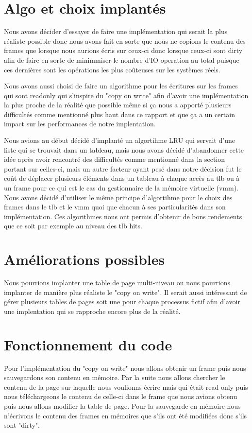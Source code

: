 \documentclass{article}
\begin{document}
\section{Algo et choix implantés}
Nous avons décider d'essayer de faire une implémentation qui serait la plus réaliste possible donc nous avons fait en sorte que nous ne copions le contenu des frames que lorsque nous aurions écris sur ceux-ci donc lorsque ceux-ci sont dirty afin de faire en sorte de minimmiser le nombre d'IO operation au total puisque ces dernières sont les opérations les plus coûteuses sur les systèmes réels. 
\par
Nous avons aussi choisi de faire un algorithme pour les écritures sur les frames qui sont readonly qui s'inspire du "copy on write" afin d'avoir une implémentation la plus proche de la réalité que possible même si ça nous a apporté plusieurs difficultés comme mentionné  plus haut dans ce rapport et que ça a un certain impact sur les performances de notre implentation.
\par 
Nous avions au début décidé d'implanté un algortihme LRU qui servait d'une liste qui se trouvait dans un tableau, mais nous avons décidé d'abandonner cette idée après avoir rencontré des difficultés comme mentionné dans la section portant sur celles-ci, mais un autre facteur ayant pesé dans notre décision fut le coût de déplacer plusieurs éléments dans un tableau à chaque accès au tlb ou à un frame pour ce qui est le cas du gestionnaire de la mémoire virtuelle (vmm). Nous avons décidé d'utiliser le même principe d'algortihme pour le choix des frames dans le tlb et le vmm quoi que chacun à ses particularités dans son  implémentation.  Ces algorithmes nous ont permis d'obtenir de bons rendements que ce soit par exemple au niveau des tlb hits.
\section{Améliorations possibles}
Nous pourrions implanter une table de page multi-niveau ou nous pourrions implanter de manière plus réaliste le "copy on write". Il serait aussi intéressant de gérer plusieurs tables de pages soit une pour chaque processus fictif afin d'avoir une implentation qui se rapproche encore plus de la réalité.

\section{Fonctionnement du code}

Pour l'implémentation du "copy on write" nous allons obtenir un frame puis nous sauvegardons son contenu en mémoire. Par la suite nous allons chercher le contenu de la page sur laquelle nous voulionns écrire mais qui était read only puis nous téléchargeons le contenu de celle-ci dans le frame que nous avions obtenu puis nous allons modifier la table de page. Pour la sauvegarde en mémoire nous n'écrivons le contenu des frames en mémoires que s'ils ont été modifiées donc s'ils sont "dirty". 
\end{document}
